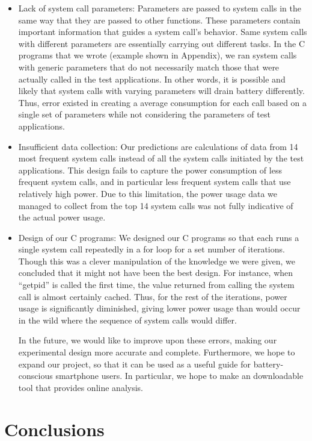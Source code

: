 \documentclass[11pt]{article}
\begin{document}
\begin{itemize}
  \item Lack of system call parameters: Parameters are passed to system calls in the same way that they are passed to other functions. 
  These parameters contain important information that guides a system call’s behavior. Same system calls with different parameters are essentially 
  carrying out different tasks. In the C programs that we wrote (example shown in Appendix), we ran system calls with generic parameters that do not necessarily match those that were actually called in the test applications. In other words, it is possible and likely that system calls with varying parameters will drain battery differently. Thus, error existed in creating a average consumption for each call based on a single set of parameters while not considering the parameters of test applications.   
  \item Insufficient data collection: Our predictions are calculations of data from 14 most frequent system calls instead of all the system calls 
  initiated by the test applications. This design fails to capture the power consumption of less frequent system calls, and in particular less frequent system calls that use relatively high power. Due to this limitation, the power usage data we managed to collect from the top 14 system calls was not fully indicative of the actual power usage. 
  \item Design of our C programs: We designed our C programs so that each runs a single system call repeatedly in a for loop for a set number of iterations. Though this was a clever manipulation of the knowledge we were given, we concluded that it might not have been the best design. For instance, when ``getpid'' is called the first time, the value returned from calling the system call is almost certainly cached. Thus, for the rest of the iterations, power usage is significantly diminished, giving lower power usage than would occur in the wild where the sequence of system calls would differ. 

In the future, we would like to improve upon these errors, making our experimental design more accurate and complete. Furthermore, we hope to expand our project, so that it can be used as a useful guide for battery-conscious smartphone users.  In particular, we hope to make an downloadable tool that provides online analysis.
\end{itemize}

\section{Conclusions}
\end{document}
